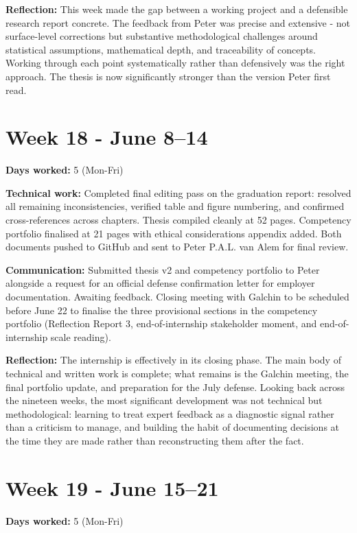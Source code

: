 \documentclass[11pt,a4paper]{article}
\begin{document}
\textbf{Reflection:} This week made the gap between a working project and a defensible research report concrete. The feedback from Peter was precise and extensive  -  not surface-level corrections but substantive methodological challenges around statistical assumptions, mathematical depth, and traceability of concepts. Working through each point systematically rather than defensively was the right approach. The thesis is now significantly stronger than the version Peter first read.

\section{Week 18  -  June 8–14}

\textbf{Days worked:} 5 (Mon-Fri)

\textbf{Technical work:} Completed final editing pass on the graduation report: resolved all remaining inconsistencies, verified table and figure numbering, and confirmed cross-references across chapters. Thesis compiled cleanly at 52 pages. Competency portfolio finalised at 21 pages with ethical considerations appendix added. Both documents pushed to GitHub and sent to Peter P.A.L. van Alem for final review.

\textbf{Communication:} Submitted thesis v2 and competency portfolio to Peter alongside a request for an official defense confirmation letter for employer documentation. Awaiting feedback. Closing meeting with Galchin to be scheduled before June 22 to finalise the three provisional sections in the competency portfolio (Reflection Report 3, end-of-internship stakeholder moment, and end-of-internship scale reading).

\textbf{Reflection:} The internship is effectively in its closing phase. The main body of technical and written work is complete; what remains is the Galchin meeting, the final portfolio update, and preparation for the July defense. Looking back across the nineteen weeks, the most significant development was not technical but methodological: learning to treat expert feedback as a diagnostic signal rather than a criticism to manage, and building the habit of documenting decisions at the time they are made rather than reconstructing them after the fact.

\section{Week 19  -  June 15–21}

\textbf{Days worked:} 5 (Mon-Fri)
\end{document}
